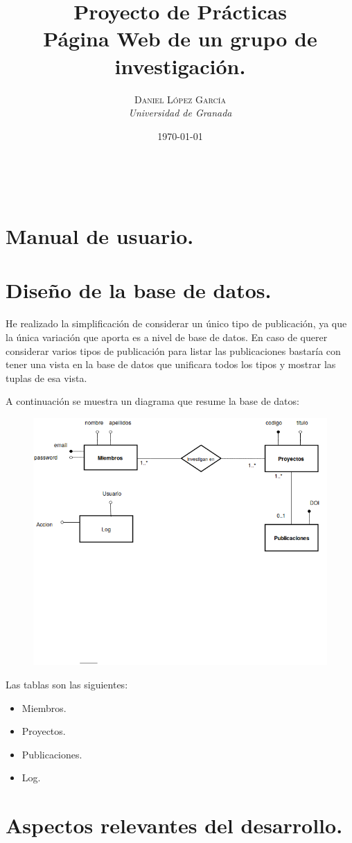 \documentclass[a4paper, 11pt]{article} %
\title{\textbf{Proyecto de Prácticas}\\ %
\vspace{20 pt}Página Web de un grupo de investigación.
} %
\author{\textsc{Daniel López García} %
\\{\textit{Universidad de Granada}}} %
\date{\today} %
\makeatletter
\renewcommand{\maketitle}{ %
	\begin{center} %
		{\Huge\@title} %
	\end{center}
	
	\vspace{20pt} %
	
	\begin{flushright} %
		{\large\@author} %
		\\\@date %
		
		\vspace{40pt} %
	\end{flushright}
	\renewcommand{\baselinestretch}{0.5}
	
}
\makeatother
\begin{document}
	\maketitle
\section{Manual de usuario.}
\section{Diseño de la base de datos.}
He realizado la simplificación de considerar un único tipo de publicación, ya que la única variación que aporta es a nivel de base de datos. En caso de querer considerar varios tipos de publicación para listar las publicaciones bastaría con tener una vista en la base de datos que unificara todos los tipos y mostrar las tuplas de esa vista. 
\medskip

A continuación se muestra un diagrama que resume la base de datos:
\begin{figure}[H]
	\includegraphics[scale=0.65]{./diagrama_er.png}
\end{figure}

	
\medskip
Las tablas son las siguientes:
\begin{itemize}
	\item Miembros.
	\item Proyectos.
	\item Publicaciones.
	\item Log.
\end{itemize}
\section{Aspectos relevantes del desarrollo.}
\end{document}
